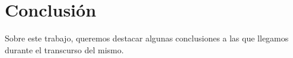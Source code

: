 \section{Conclusión}

Sobre este trabajo, queremos destacar algunas conclusiones a las que llegamos durante el transcurso del mismo. 
